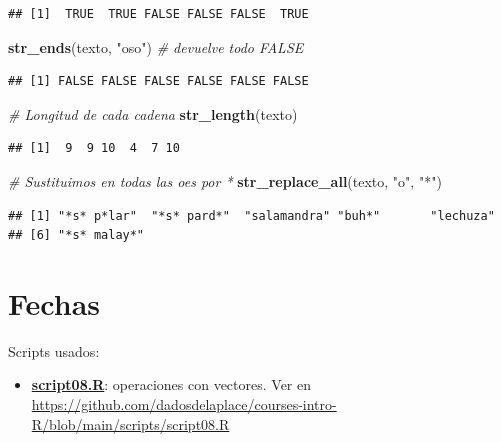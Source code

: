 \documentclass[11pt,]{book}
\newenvironment{Shaded}{\begin{snugshade}}{\end{snugshade}}
\newcommand{\CommentTok}[1]{\textcolor[rgb]{0.37,0.37,0.37}{\textit{#1}}}
\newcommand{\KeywordTok}[1]{\textcolor[rgb]{0.27,0.27,0.27}{\textbf{#1}}}
\newcommand{\NormalTok}[1]{#1}
\newcommand{\StringTok}[1]{\textcolor[rgb]{0.5,0.5,0.5}{#1}}
\providecommand{\tightlist}{%
  \setlength{\itemsep}{0pt}\setlength{\parskip}{0pt}}
\begin{document}
\begin{verbatim}
## [1]  TRUE  TRUE FALSE FALSE FALSE  TRUE
\end{verbatim}

\begin{Shaded}
\begin{Highlighting}[]
\KeywordTok{str_ends}\NormalTok{(texto, }\StringTok{"oso"}\NormalTok{) }\CommentTok{# devuelve todo FALSE}
\end{Highlighting}
\end{Shaded}

\begin{verbatim}
## [1] FALSE FALSE FALSE FALSE FALSE FALSE
\end{verbatim}

\begin{Shaded}
\begin{Highlighting}[]
\CommentTok{# Longitud de cada cadena}
\KeywordTok{str_length}\NormalTok{(texto)}
\end{Highlighting}
\end{Shaded}

\begin{verbatim}
## [1]  9  9 10  4  7 10
\end{verbatim}

\begin{Shaded}
\begin{Highlighting}[]
\CommentTok{# Sustituimos en todas las oes por *}
\KeywordTok{str_replace_all}\NormalTok{(texto, }\StringTok{"o"}\NormalTok{, }\StringTok{"*"}\NormalTok{)}
\end{Highlighting}
\end{Shaded}

\begin{verbatim}
## [1] "*s* p*lar"  "*s* pard*"  "salamandra" "buh*"       "lechuza"   
## [6] "*s* malay*"
\end{verbatim}

\hypertarget{fechas}{%
\section{Fechas}\label{fechas}}

\begin{blackbox}

Scripts usados:

\begin{itemize}
\tightlist
\item
  \href{https://github.com/dadosdelaplace/courses-intro-R/blob/main/scripts/script08.R}{\textbf{script08.R}}: operaciones con vectores. Ver en \url{https://github.com/dadosdelaplace/courses-intro-R/blob/main/scripts/script08.R}
\end{itemize}


\end{blackbox}
\end{document}
